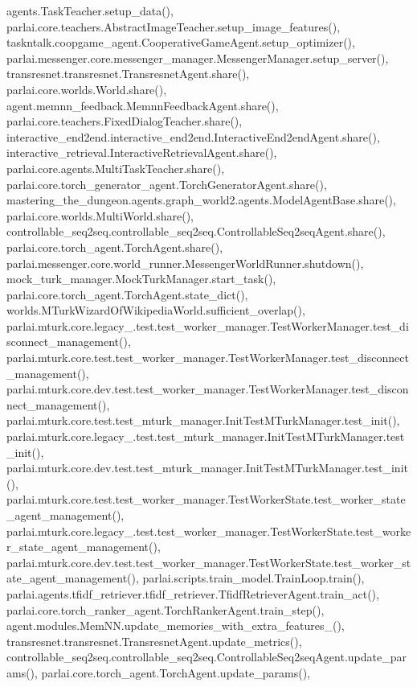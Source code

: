 agents.\+Task\+Teacher.\+setup\+\_\+data(), parlai.\+core.\+teachers.\+Abstract\+Image\+Teacher.\+setup\+\_\+image\+\_\+features(), taskntalk.\+coopgame\+\_\+agent.\+Cooperative\+Game\+Agent.\+setup\+\_\+optimizer(), parlai.\+messenger.\+core.\+messenger\+\_\+manager.\+Messenger\+Manager.\+setup\+\_\+server(), transresnet.\+transresnet.\+Transresnet\+Agent.\+share(), parlai.\+core.\+worlds.\+World.\+share(), agent.\+memnn\+\_\+feedback.\+Memnn\+Feedback\+Agent.\+share(), parlai.\+core.\+teachers.\+Fixed\+Dialog\+Teacher.\+share(), interactive\+\_\+end2end.\+interactive\+\_\+end2end.\+Interactive\+End2end\+Agent.\+share(), interactive\+\_\+retrieval.\+Interactive\+Retrieval\+Agent.\+share(), parlai.\+core.\+agents.\+Multi\+Task\+Teacher.\+share(), parlai.\+core.\+torch\+\_\+generator\+\_\+agent.\+Torch\+Generator\+Agent.\+share(), mastering\+\_\+the\+\_\+dungeon.\+agents.\+graph\+\_\+world2.\+agents.\+Model\+Agent\+Base.\+share(), parlai.\+core.\+worlds.\+Multi\+World.\+share(), controllable\+\_\+seq2seq.\+controllable\+\_\+seq2seq.\+Controllable\+Seq2seq\+Agent.\+share(), parlai.\+core.\+torch\+\_\+agent.\+Torch\+Agent.\+share(), parlai.\+messenger.\+core.\+world\+\_\+runner.\+Messenger\+World\+Runner.\+shutdown(), mock\+\_\+turk\+\_\+manager.\+Mock\+Turk\+Manager.\+start\+\_\+task(), parlai.\+core.\+torch\+\_\+agent.\+Torch\+Agent.\+state\+\_\+dict(), worlds.\+M\+Turk\+Wizard\+Of\+Wikipedia\+World.\+sufficient\+\_\+overlap(), parlai.\+mturk.\+core.\+legacy\+\_.\+test.\+test\+\_\+worker\+\_\+manager.\+Test\+Worker\+Manager.\+test\+\_\+disconnect\+\_\+management(), parlai.\+mturk.\+core.\+test.\+test\+\_\+worker\+\_\+manager.\+Test\+Worker\+Manager.\+test\+\_\+disconnect\+\_\+management(), parlai.\+mturk.\+core.\+dev.\+test.\+test\+\_\+worker\+\_\+manager.\+Test\+Worker\+Manager.\+test\+\_\+disconnect\+\_\+management(), parlai.\+mturk.\+core.\+test.\+test\+\_\+mturk\+\_\+manager.\+Init\+Test\+M\+Turk\+Manager.\+test\+\_\+init(), parlai.\+mturk.\+core.\+legacy\+\_.\+test.\+test\+\_\+mturk\+\_\+manager.\+Init\+Test\+M\+Turk\+Manager.\+test\+\_\+init(), parlai.\+mturk.\+core.\+dev.\+test.\+test\+\_\+mturk\+\_\+manager.\+Init\+Test\+M\+Turk\+Manager.\+test\+\_\+init(), parlai.\+mturk.\+core.\+test.\+test\+\_\+worker\+\_\+manager.\+Test\+Worker\+State.\+test\+\_\+worker\+\_\+state\+\_\+agent\+\_\+management(), parlai.\+mturk.\+core.\+legacy\+\_.\+test.\+test\+\_\+worker\+\_\+manager.\+Test\+Worker\+State.\+test\+\_\+worker\+\_\+state\+\_\+agent\+\_\+management(), parlai.\+mturk.\+core.\+dev.\+test.\+test\+\_\+worker\+\_\+manager.\+Test\+Worker\+State.\+test\+\_\+worker\+\_\+state\+\_\+agent\+\_\+management(), parlai.\+scripts.\+train\+\_\+model.\+Train\+Loop.\+train(), parlai.\+agents.\+tfidf\+\_\+retriever.\+tfidf\+\_\+retriever.\+Tfidf\+Retriever\+Agent.\+train\+\_\+act(), parlai.\+core.\+torch\+\_\+ranker\+\_\+agent.\+Torch\+Ranker\+Agent.\+train\+\_\+step(), agent.\+modules.\+Mem\+N\+N.\+update\+\_\+memories\+\_\+with\+\_\+extra\+\_\+features\+\_\+(), transresnet.\+transresnet.\+Transresnet\+Agent.\+update\+\_\+metrics(), controllable\+\_\+seq2seq.\+controllable\+\_\+seq2seq.\+Controllable\+Seq2seq\+Agent.\+update\+\_\+params(), parlai.\+core.\+torch\+\_\+agent.\+Torch\+Agent.\+update\+\_\+params(), 